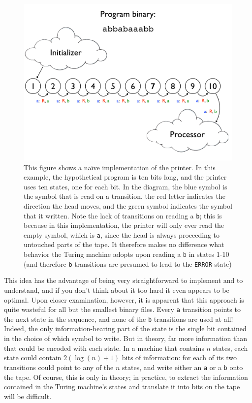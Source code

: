 \documentclass[11pt]{article}
\begin{document}
\begin{figure}
\begin{center}
\includegraphics[scale=0.42]{figs/naiveprog.png}
\caption{This figure shows a na\"ive implementation of the printer. In this example, the hypothetical program is ten bits long, and the printer uses ten states, one for each bit. In the diagram, the blue symbol is the symbol that is read on a transition, the red letter indicates the direction the head moves, and the green symbol indicates the symbol that it written. Note the lack of transitions on reading a \texttt{b}; this is because in this implementation, the printer will only ever read the empty symbol, which is \texttt{a}, since the head is always proceeding to untouched parts of the tape. It therefore makes no difference what behavior the Turing machine adopts upon reading a \texttt{b} in states 1-10 (and therefore \texttt{b} transitions are presumed to lead to the \texttt{ERROR} state) \label{fig:naiveprog}}
\end{center}
\end{figure}

This idea has the advantage of being very straightforward to implement and to understand, and if you don't think about it too hard it even appears to be optimal. Upon closer examination, however, it is apparent that this approach is quite wasteful for all but the smallest binary files. Every \texttt{a} transition points to the next state in the sequence, and none of the \texttt{b} transitions are used at all! Indeed, the only information-bearing part of the state is the single bit contained in the choice of which symbol to write. But in theory, far more information than that could be encoded with each state. In a machine that contains $n$ states, each state could contain $2(\log(n) + 1)$ bits of information: for each of its two transitions could point to any of the $n$ states, and write either an \texttt{a} or a \texttt{b} onto the tape. Of course, this is only in theory; in practice, to extract the information contained in the Turing machine's states and translate it into bits on the tape will be difficult. \\
\end{document}
